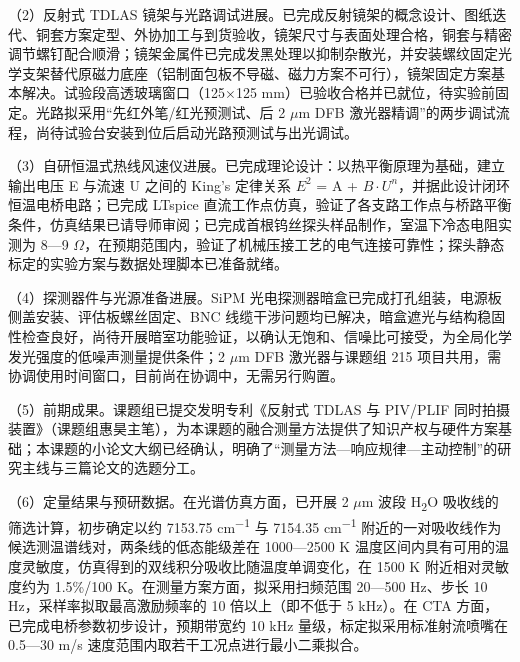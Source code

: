 \documentclass[UTF8,a4paper,zihao=-4,fontset=windows]{ctexart}
\begin{document}
（2）反射式 TDLAS 镜架与光路调试进展。已完成反射镜架的概念设计、图纸迭代、铜套方案定型、外协加工与到货验收，镜架尺寸与表面处理合格，铜套与精密调节螺钉配合顺滑；镜架金属件已完成发黑处理以抑制杂散光，并安装螺纹固定光学支架替代原磁力底座（铝制面包板不导磁、磁力方案不可行），镜架固定方案基本解决。试验段高透玻璃窗口（125$\times$125 mm）已验收合格并已就位，待实验前固定。光路拟采用“先红外笔/红光预测试、后 2 $\mu$m DFB 激光器精调”的两步调试流程，尚待试验台安装到位后启动光路预测试与出光调试。

（3）自研恒温式热线风速仪进展。已完成理论设计：以热平衡原理为基础，建立输出电压 E 与流速 U 之间的 \mbox{King's} 定律关系 $E^{2}$ = A + $B\cdot U^{n}$，并据此设计闭环恒温电桥电路；已完成 LTspice 直流工作点仿真，验证了各支路工作点与桥路平衡条件，仿真结果已请导师审阅；已完成首根钨丝探头样品制作，室温下冷态电阻实测为 8—9 $\Omega$，在预期范围内，验证了机械压接工艺的电气连接可靠性；探头静态标定的实验方案与数据处理脚本已准备就绪。

（4）探测器件与光源准备进展。SiPM 光电探测器暗盒已完成打孔组装，电源板侧盖安装、评估板螺丝固定、BNC 线缆干涉问题均已解决，暗盒遮光与结构稳固性检查良好，尚待开展暗室功能验证，以确认无饱和、信噪比可接受，为全局化学发光强度的低噪声测量提供条件；2 $\mu$m DFB 激光器与课题组 215 项目共用，需协调使用时间窗口，目前尚在协调中，无需另行购置。

（5）前期成果。课题组已提交发明专利《反射式 TDLAS 与 PIV/PLIF 同时拍摄装置》（课题组惠昊主笔），为本课题的融合测量方法提供了知识产权与硬件方案基础；本课题的小论文大纲已经确认，明确了“测量方法—响应规律—主动控制”的研究主线与三篇论文的选题分工。

（6）定量结果与预研数据。在光谱仿真方面，已开展 2 $\mu$m 波段 H\textsubscript{2}O 吸收线的筛选计算，初步确定以约 7153.75 cm\textsuperscript{$-1$} 与 7154.35 cm\textsuperscript{$-1$} 附近的一对吸收线作为候选测温谱线对，两条线的低态能级差在 1000—2500 K 温度区间内具有可用的温度灵敏度，仿真得到的双线积分吸收比随温度单调变化，在 1500 K 附近相对灵敏度约为 1.5\%/100 K。在测量方案方面，拟采用扫频范围 20—500 Hz、步长 10 Hz，采样率拟取最高激励频率的 10 倍以上（即不低于 5 kHz）。在 CTA 方面，已完成电桥参数初步设计，预期带宽约 10 kHz 量级，标定拟采用标准射流喷嘴在 0.5—30 m/s 速度范围内取若干工况点进行最小二乘拟合。
\end{document}
